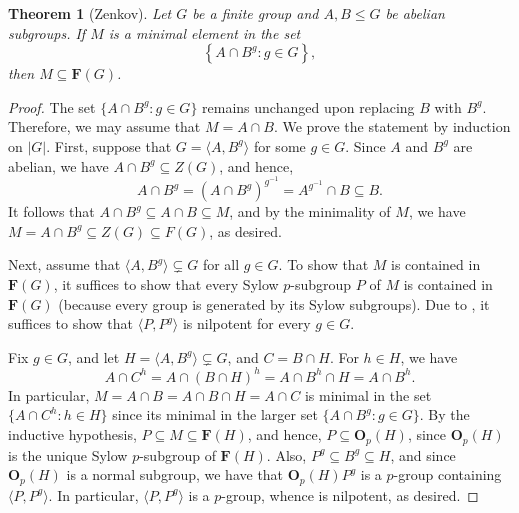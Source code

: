 \documentclass[12pt]{article}
\theoremstyle{thmstyle}
\newtheorem{theorem}{Theorem}[section]
\theoremstyle{defstyle}
\renewcommand{\le}{\leqslant}
\newcommand{\bfO}{\mathbf{O}}
\newcommand{\bfF}{\mathbf{F}} %
\begin{document}
\begin{theorem}[Zenkov]
    Let $G$ be a finite group and $A, B\le G$ be abelian subgroups. If $M$ is a minimal element in the set 
    \begin{equation*}
        \left\{A\cap B^g\colon g\in G\right\},
    \end{equation*}
    then $M\subseteq\bfF(G)$.
\end{theorem}
\begin{proof}
    The set $\{A\cap B^g\colon g\in G\}$ remains unchanged upon replacing $B$ with $B^g$. Therefore, we may assume that $M = A\cap B$. We prove the statement by induction on $|G|$. First, suppose that $G = \langle A, B^g\rangle$ for some $g\in G$. Since $A$ and $B^g$ are abelian, we have $A\cap B^g\subseteq Z(G)$, and hence, 
    \begin{equation*}
        A\cap B^g = \left(A\cap B^g\right)^{g^{-1}} = A^{g^{-1}}\cap B\subseteq B.
    \end{equation*}
    It follows that $A\cap B^g\subseteq A\cap B\subseteq M$, and by the minimality of $M$, we have $M = A\cap B^g\subseteq Z(G)\subseteq F(G)$, as desired.

    Next, assume that $\langle A, B^g\rangle\subsetneq G$ for all $g\in G$. To show that $M$ is contained in $\bfF(G)$, it suffices to show that every Sylow $p$-subgroup $P$ of $M$ is contained in $\bfF(G)$ (because every group is generated by its Sylow subgroups). Due to , it suffices to show that $\langle P, P^g\rangle$ is nilpotent for every $g\in G$.

    Fix $g\in G$, and let $H = \langle A, B^g\rangle\subsetneq G$, and $C = B\cap H$. For $h\in H$, we have 
    \begin{equation*}
        A\cap C^h = A\cap\left(B\cap H\right)^h = A\cap B^h\cap H = A\cap B^h.
    \end{equation*}
    In particular, $M = A\cap B = A\cap B\cap H = A\cap C$ is minimal in the set $\{A\cap C^h\colon h\in H\}$ since its minimal in the larger set $\{A\cap B^g\colon g\in G\}$. By the inductive hypothesis, $P\subseteq M\subseteq\bfF(H)$, and hence, $P\subseteq\bfO_p(H)$, since $\bfO_p(H)$ is the unique Sylow $p$-subgroup of $\bfF(H)$. Also, $P^g\subseteq B^g\subseteq H$, and since $\bfO_p(H)$ is a normal subgroup, we have that $\bfO_p(H)P^g$ is a $p$-group containing $\langle P, P^g\rangle$. In particular, $\langle P, P^g\rangle$ is a $p$-group, whence is nilpotent, as desired.
\end{proof}
\end{document}
